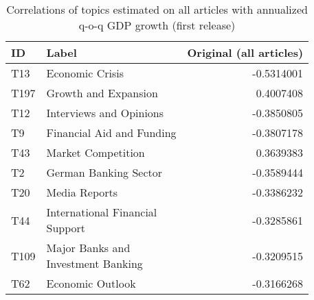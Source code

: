 \begin{table}[!h]
\centering
\caption{Correlations of topics estimated on all articles with annualized q-o-q GDP growth (first release)}
\centering
\begin{tabular}[t]{llr}
\toprule
ID & Label & Original (all articles)\\
\midrule
T13 & Economic Crisis & -0.5314001\\
T197 & Growth and Expansion & 0.4007408\\
T12 & Interviews and Opinions & -0.3850805\\
T9 & Financial Aid and Funding & -0.3807178\\
T43 & Market Competition & 0.3639383\\
\addlinespace
T2 & German Banking Sector & -0.3589444\\
T20 & Media Reports & -0.3386232\\
T44 & \makecell[tl]{International Financial \\ Support} & -0.3285861\\
T109 & \makecell[tl]{Major Banks and \\ Investment Banking} & -0.3209515\\
T62 & Economic Outlook & -0.3166268\\
\bottomrule
\end{tabular}
\end{table}
